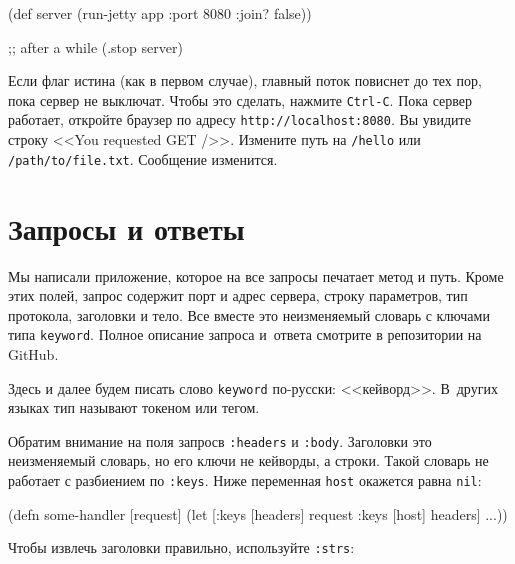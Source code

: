 \begin{english}
  \begin{clojure}
(def server
  (run-jetty app {:port 8080 :join? false}))

;; after a while
(.stop server)
  \end{clojure}
\end{english}

Если флаг истина (как в первом случае), главный поток повиснет до тех пор, пока
сервер не выключат. Чтобы это сделать, нажмите \verb|Ctrl-C|. Пока сервер
работает, откройте браузер по адресу \verb|http://localhost:8080|. Вы увидите
строку <<You requested GET />>. Измените путь на \verb|/hello| или
\verb|/path/to/file.txt|. Сообщение изменится.

\section{Запросы и ответы}

Мы написали приложение, которое на все запросы печатает метод и путь. Кроме этих
полей, запрос содержит порт и адрес сервера, строку параметров, тип протокола,
заголовки и тело. Все вместе это неизменяемый словарь с ключами типа
\verb|keyword|. Полное описание запроса и~ответа смотрите в репозитории на
GitHub.


Здесь и далее будем писать слово \verb|keyword| по-русски:
<<кейворд>>. В~других языках тип называют токеном или тегом.


Обратим внимание на поля запросв \verb|:headers| и \verb|:body|. Заголовки
это неизменяемый словарь, но его ключи не кейворды, а строки. Такой словарь не
работает с разбиением по \verb|:keys|. Ниже переменная \verb|host| окажется
равна \verb|nil|:


\begin{english}
  \begin{clojure}
(defn some-handler
  [request]
  (let [{:keys [headers]} request
        {:keys [host]} headers]
    ...))
  \end{clojure}
\end{english}


\noindent
Чтобы извлечь заголовки правильно, используйте \verb|:strs|:

